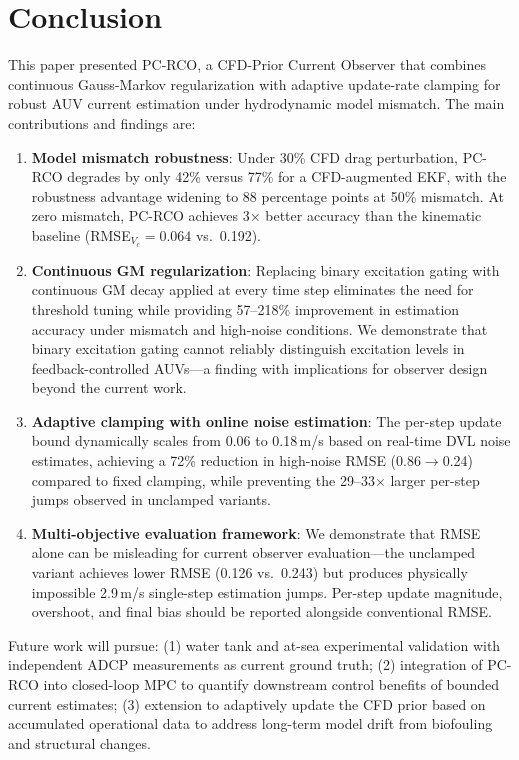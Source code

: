 \section{Conclusion}

This paper presented PC-RCO, a CFD-Prior Current Observer that combines continuous Gauss-Markov regularization with adaptive update-rate clamping for robust AUV current estimation under hydrodynamic model mismatch. The main contributions and findings are:

\begin{enumerate}[itemsep=0pt,topsep=4pt]
    \item \textbf{Model mismatch robustness}: Under 30\% CFD drag perturbation, PC-RCO degrades by only 42\% versus 77\% for a CFD-augmented EKF, with the robustness advantage widening to 88 percentage points at 50\% mismatch. At zero mismatch, PC-RCO achieves 3$\times$ better accuracy than the kinematic baseline (RMSE$_{V_c}=0.064$ vs.\ 0.192).

    \item \textbf{Continuous GM regularization}: Replacing binary excitation gating with continuous GM decay applied at every time step eliminates the need for threshold tuning while providing 57--218\% improvement in estimation accuracy under mismatch and high-noise conditions. We demonstrate that binary excitation gating cannot reliably distinguish excitation levels in feedback-controlled AUVs---a finding with implications for observer design beyond the current work.

    \item \textbf{Adaptive clamping with online noise estimation}: The per-step update bound dynamically scales from 0.06 to 0.18\,m/s based on real-time DVL noise estimates, achieving a 72\% reduction in high-noise RMSE (0.86$\rightarrow$0.24) compared to fixed clamping, while preventing the 29--33$\times$ larger per-step jumps observed in unclamped variants.

    \item \textbf{Multi-objective evaluation framework}: We demonstrate that RMSE alone can be misleading for current observer evaluation---the unclamped variant achieves lower RMSE (0.126 vs.\ 0.243) but produces physically impossible 2.9\,m/s single-step estimation jumps. Per-step update magnitude, overshoot, and final bias should be reported alongside conventional RMSE.
\end{enumerate}

Future work will pursue: (1) water tank and at-sea experimental validation with independent ADCP measurements as current ground truth; (2) integration of PC-RCO into closed-loop MPC to quantify downstream control benefits of bounded current estimates; (3) extension to adaptively update the CFD prior based on accumulated operational data to address long-term model drift from biofouling and structural changes.
